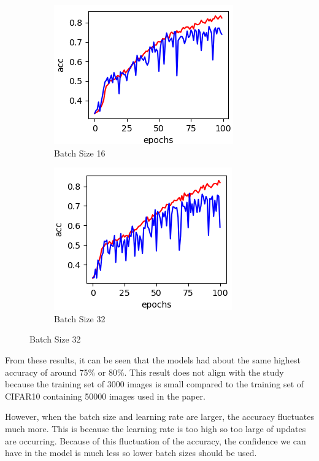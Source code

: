 \documentclass[../main.tex]{subfiles}
\begin{document}
\begin{figure}[h!]
  \centering
  \begin{subfigure}[b]{0.3\linewidth}
    \includegraphics[width=\linewidth]{batch-size-img/bs16.png}
    \caption{Batch Size 16}
  \end{subfigure}
  \begin{subfigure}[b]{0.3\linewidth}
    \includegraphics[width=\linewidth]{batch-size-img/bs32.png}
    \caption{Batch Size 32}
  \end{subfigure}
\end{figure}

From these results, it can be seen that the models had about the same highest accuracy of around 75\% or 80\%. This result does not align with the study because the training set of 3000 images is small compared to the training set of CIFAR10 containing 50000 images used in the paper. 

However, when the batch size and learning rate are larger, the accuracy fluctuates much more. This is because the learning rate is too high so too large of updates are occurring. Because of this fluctuation of the accuracy, the confidence we can have in the model is much less so lower batch sizes should be used.
\end{document}
